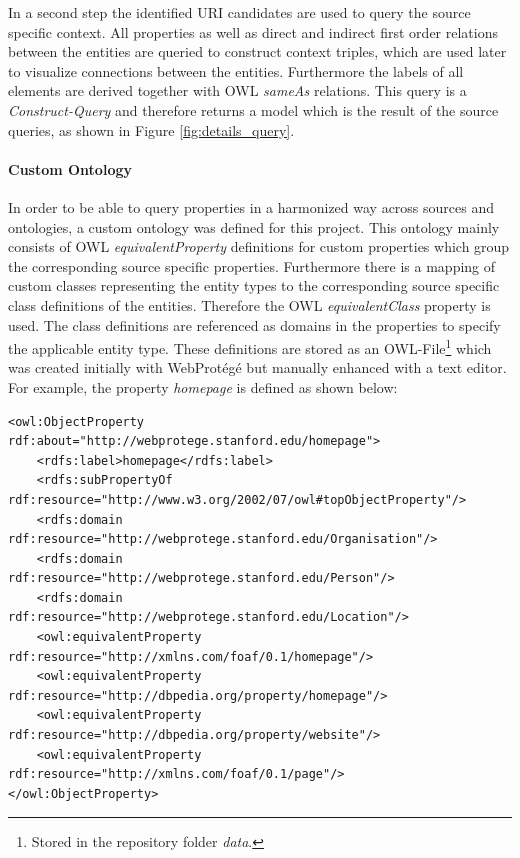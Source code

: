 In a second step the identified URI candidates are used to query the source specific context. All properties as well as direct and indirect first order relations between the entities are queried to construct context triples, which are used later to visualize connections between the entities. Furthermore the labels of all elements are derived together with OWL \textit{sameAs} relations. 
This query is a \textit{Construct-Query} and therefore returns a model which is the result of the source queries, as shown in Figure \ref{fig:details_query}. 

\paragraph{Custom Ontology}
In order to be able to query properties in a harmonized way across sources and ontologies, a custom ontology was defined for this project. This  ontology mainly consists of OWL \textit{equivalentProperty} definitions for custom properties which group the corresponding source specific properties. Furthermore there is a mapping of custom classes representing the entity types to the corresponding source specific class definitions of the entities. Therefore the OWL \textit{equivalentClass} property is used. The class definitions are referenced as domains in the properties to specify the applicable entity type. These definitions are stored as an OWL-File\footnote{Stored in the repository folder \textit{data}.} which was created initially with WebProtégé \cite{stanford_university_webprotege_2016} but manually enhanced with a text editor. For example, the property \textit{homepage} is defined as shown below:


\tiny
\begin{lstlisting}
<owl:ObjectProperty rdf:about="http://webprotege.stanford.edu/homepage">
	<rdfs:label>homepage</rdfs:label>
	<rdfs:subPropertyOf rdf:resource="http://www.w3.org/2002/07/owl#topObjectProperty"/>
	<rdfs:domain rdf:resource="http://webprotege.stanford.edu/Organisation"/>
	<rdfs:domain rdf:resource="http://webprotege.stanford.edu/Person"/>
	<rdfs:domain rdf:resource="http://webprotege.stanford.edu/Location"/>
	<owl:equivalentProperty rdf:resource="http://xmlns.com/foaf/0.1/homepage"/>
	<owl:equivalentProperty rdf:resource="http://dbpedia.org/property/homepage"/>
	<owl:equivalentProperty rdf:resource="http://dbpedia.org/property/website"/>
	<owl:equivalentProperty rdf:resource="http://xmlns.com/foaf/0.1/page"/>
</owl:ObjectProperty>
\end{lstlisting}
\normalsize



